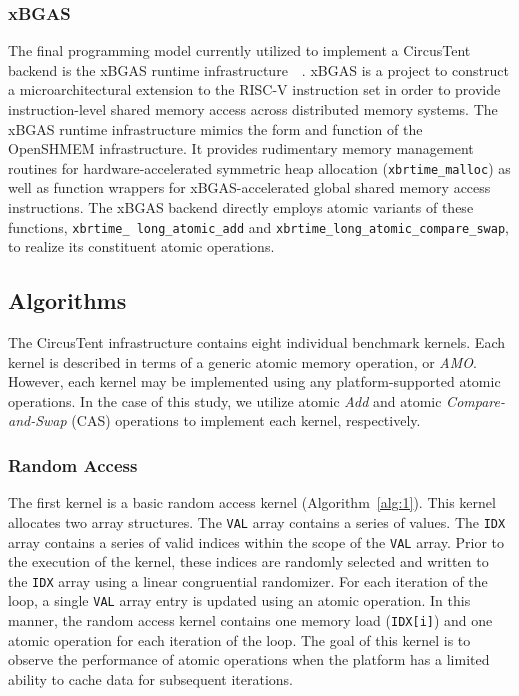 \subsubsection{xBGAS}
\label{subsubsec:xbgas}
The final programming model currently utilized to implement a CircusTent backend is the xBGAS runtime infrastructure~\cite{leidel2018xbgas}~\cite{xbgasspec}.
xBGAS is a project to construct a microarchitectural extension to the RISC-V instruction set in order to provide instruction-level shared memory access across distributed memory systems.
The xBGAS runtime infrastructure mimics the form and function of the OpenSHMEM infrastructure.
It provides rudimentary memory management routines for hardware-accelerated symmetric heap allocation (\texttt{xbrtime\_malloc}) as well as function wrappers for xBGAS-accelerated global shared memory access instructions.
The xBGAS backend directly employs atomic variants of these functions, \texttt{xbrtime\_ long\_atomic\_add} and \texttt{xbrtime\_long\_atomic\_compare\_swap}, to realize its constituent atomic operations.  

\subsection{Algorithms}
\label{subsec:algorithms}

The CircusTent infrastructure contains eight individual benchmark kernels.
Each kernel is described in terms of a generic atomic memory operation, or \textit{AMO}.  
However, each kernel may be implemented using any platform-supported atomic operations.
In the case of this study, we utilize atomic \textit{Add} and atomic \textit{Compare-and-Swap} (CAS) operations to implement each kernel, respectively.  

\subsubsection{Random Access}
\label{subsubsec:random_access}

The first kernel is a basic random access kernel (Algorithm~\ref{alg:1}).
This kernel allocates two array structures.
The \texttt{VAL} array contains a series of values.
The \texttt{IDX} array contains a series of valid indices within the scope of the \texttt{VAL} array.
Prior to the execution of the kernel, these indices are randomly selected and written to the \texttt{IDX} array using a linear congruential randomizer.
For each iteration of the loop, a single \texttt{VAL} array entry is updated using an atomic operation.
In this manner, the random access kernel contains one memory load (\texttt{IDX[i]}) and one atomic operation for each iteration of the loop.
The goal of this kernel is to observe the performance of atomic operations when the platform has a limited ability to cache data for subsequent iterations.  

